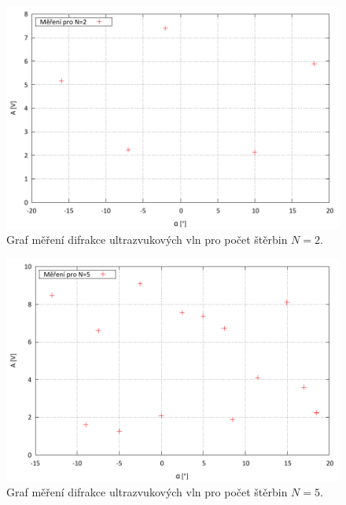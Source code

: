 \documentclass[english]{article}
\begin{document}
	\begin{figure}[p]
	\begin{center}
	    \vspace*{-1cm}
	    \includegraphics[width=\linewidth]{../gnuplot/8_sonar_if_2_out.pdf}
	    \vspace*{-1cm}    
		\caption{Graf měření difrakce ultrazvukových vln pro počet štěrbin $N=2$.}
		\label{fig:g_difrakce_n2}
	\end{center}
	\end{figure}
	
	\begin{figure}[p]
	\begin{center}
	    \vspace*{-1cm}
	    \includegraphics[width=\linewidth]{../gnuplot/8_sonar_if_3_out.pdf}
	    \vspace*{-1cm}    
		\caption{Graf měření difrakce ultrazvukových vln pro počet štěrbin $N=5$.}
		\label{fig:g_difrakce_n5}
	\end{center}
	\end{figure}	
	
\end{document}
